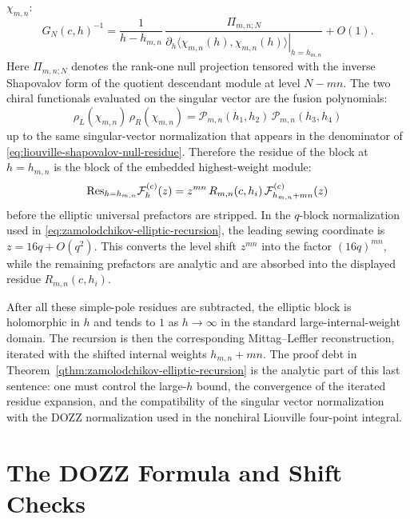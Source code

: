 \(\chi_{m,n}\):
\begin{equation}
  G_N(c,h)^{-1}
  =
  \frac{1}{h-h_{m,n}}\,
  \frac{\Pi_{m,n;N}}{
    \left.\partial_h
      \langle\chi_{m,n}(h),\chi_{m,n}(h)\rangle
    \right|_{h=h_{m,n}}
  }
  +O(1).
  \label{eq:liouville-shapovalov-null-residue}
\end{equation}
Here \(\Pi_{m,n;N}\) denotes the rank-one null projection tensored with the
inverse Shapovalov form of the quotient descendant module at level
\(N-mn\).  The two chiral functionals evaluated on the singular vector are
the fusion polynomials:
\begin{equation}
  \rho_L(\chi_{m,n})\,\rho_R(\chi_{m,n})
  =
  \mathcal P_{m,n}(h_1,h_2)\,
  \mathcal P_{m,n}(h_3,h_4)
\end{equation}
up to the same singular-vector normalization that appears in the denominator
of \eqref{eq:liouville-shapovalov-null-residue}.  Therefore the residue of
the block at \(h=h_{m,n}\) is the block of the embedded highest-weight
module:
\begin{equation}
  {\rm Res}_{h=h_{m,n}}\mathcal F_h^{(c)}(z)
  =
  z^{mn}\,
  R_{m,n}(c,h_i)\,
  \mathcal F_{h_{m,n}+mn}^{(c)}(z)
\end{equation}
before the elliptic universal prefactors are stripped.  In the \(q\)-block
normalization used in
\eqref{eq:zamolodchikov-elliptic-recursion}, the leading sewing coordinate
is \(z=16q+O(q^2)\).  This converts the level shift \(z^{mn}\) into the
factor \((16q)^{mn}\), while the remaining prefactors are analytic and are
absorbed into the displayed residue \(R_{m,n}(c,h_i)\).

After all these simple-pole residues are subtracted, the elliptic block is
holomorphic in \(h\) and tends to \(1\) as \(h\to\infty\) in the standard
large-internal-weight domain.  The recursion is then the corresponding
Mittag--Leffler reconstruction, iterated with the shifted internal weights
\(h_{m,n}+mn\).  The proof debt in
Theorem~\ref{qthm:zamolodchikov-elliptic-recursion} is the analytic part of
this last sentence: one must control the large-\(h\) bound, the convergence
of the iterated residue expansion, and the compatibility of the singular
vector normalization with the DOZZ normalization used in the nonchiral
Liouville four-point integral.

\section{The DOZZ Formula and Shift Checks}

